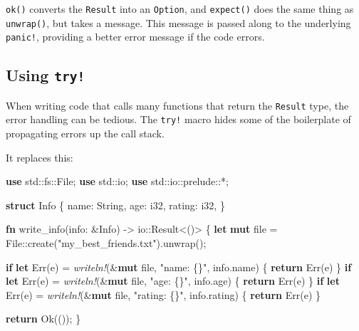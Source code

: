 \documentclass[a4paper,]{book}
\newenvironment{Shaded}{\begin{snugshade}}{\end{snugshade}}
\newcommand{\KeywordTok}[1]{\textcolor[rgb]{0.13,0.29,0.53}{\textbf{{#1}}}}
\newcommand{\DataTypeTok}[1]{\textcolor[rgb]{0.13,0.29,0.53}{{#1}}}
\newcommand{\ConstantTok}[1]{\textcolor[rgb]{0.00,0.00,0.00}{{#1}}}
\newcommand{\StringTok}[1]{\textcolor[rgb]{0.31,0.60,0.02}{{#1}}}
\newcommand{\PreprocessorTok}[1]{\textcolor[rgb]{0.56,0.35,0.01}{\textit{{#1}}}}
\newcommand{\NormalTok}[1]{{#1}}
\begin{document}
\texttt{ok()} converts the \texttt{Result} into an \texttt{Option}, and
\texttt{expect()} does the same thing as \texttt{unwrap()}, but takes a
message. This message is passed along to the underlying \texttt{panic!},
providing a better error message if the code errors.

\subsection{\texorpdfstring{Using
\texttt{try!}}{Using try!}}\label{using-try}

When writing code that calls many functions that return the
\texttt{Result} type, the error handling can be tedious. The
\texttt{try!} macro hides some of the boilerplate of propagating errors
up the call stack.

It replaces this:

\begin{Shaded}
\begin{Highlighting}[]
\KeywordTok{use} \NormalTok{std::fs::File;}
\KeywordTok{use} \NormalTok{std::io;}
\KeywordTok{use} \NormalTok{std::io::prelude::*;}

\KeywordTok{struct} \NormalTok{Info \{}
    \NormalTok{name: }\DataTypeTok{String}\NormalTok{,}
    \NormalTok{age: }\DataTypeTok{i32}\NormalTok{,}
    \NormalTok{rating: }\DataTypeTok{i32}\NormalTok{,}
\NormalTok{\}}

\KeywordTok{fn} \NormalTok{write_info(info: &Info) -> io::}\DataTypeTok{Result}\NormalTok{<()> \{}
    \KeywordTok{let} \KeywordTok{mut} \NormalTok{file = File::create(}\StringTok{"my_best_friends.txt"}\NormalTok{).unwrap();}

    \KeywordTok{if} \KeywordTok{let} \ConstantTok{Err}\NormalTok{(e) = }\PreprocessorTok{writeln!}\NormalTok{(&}\KeywordTok{mut} \NormalTok{file, }\StringTok{"name: \{\}"}\NormalTok{, info.name) \{}
        \KeywordTok{return} \ConstantTok{Err}\NormalTok{(e)}
    \NormalTok{\}}
    \KeywordTok{if} \KeywordTok{let} \ConstantTok{Err}\NormalTok{(e) = }\PreprocessorTok{writeln!}\NormalTok{(&}\KeywordTok{mut} \NormalTok{file, }\StringTok{"age: \{\}"}\NormalTok{, info.age) \{}
        \KeywordTok{return} \ConstantTok{Err}\NormalTok{(e)}
    \NormalTok{\}}
    \KeywordTok{if} \KeywordTok{let} \ConstantTok{Err}\NormalTok{(e) = }\PreprocessorTok{writeln!}\NormalTok{(&}\KeywordTok{mut} \NormalTok{file, }\StringTok{"rating: \{\}"}\NormalTok{, info.rating) \{}
        \KeywordTok{return} \ConstantTok{Err}\NormalTok{(e)}
    \NormalTok{\}}

    \KeywordTok{return} \ConstantTok{Ok}\NormalTok{(());}
\NormalTok{\}}
\end{Highlighting}
\end{Shaded}
\end{document}

